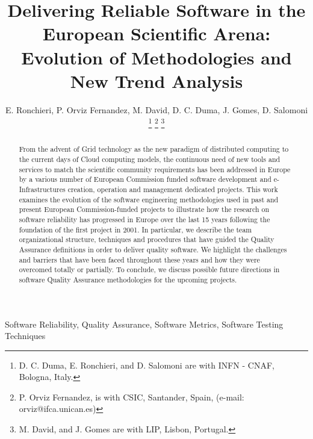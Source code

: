 \documentclass[journal]{IEEEtran}
\begin{document}
\title{Delivering Reliable Software in the European Scientific Arena: Evolution of Methodologies and New Trend Analysis}

\author{E. Ronchieri,
        P. Orviz Fernandez,
        M. David,
		D. C. Duma,
        J. Gomes,
        D. Salomoni
\thanks{D. C. Duma, E. Ronchieri, and D. Salomoni are with INFN - CNAF, Bologna, Italy.}
\thanks{P. Orviz Fernandez, is with CSIC, Santander, Spain, (e-mail: orviz@ifca.unican.es)}
\thanks{M. David, and J. Gomes are with LIP, Lisbon, Portugal.}%
}


\maketitle

\begin{abstract}
From the advent of Grid technology as the new paradigm of distributed
computing to the current days of Cloud computing models, the continuous need
of new tools and services to match the scientific community requirements has been
addressed in Europe by a various number of European Commission funded software development
and e-Infrastructures creation, operation and management dedicated projects.
This work examines the evolution of the software engineering methodologies used in past and present
European Commission-funded projects to illustrate how the research on software
reliability has progressed in Europe over the last 15 years following the
foundation of the first project in 2001. In particular, we describe the team
organizational structure, %
 techniques and procedures that have guided the Quality
Assurance definitions in order to deliver quality software. We highlight the challenges
and barriers that have been faced throughout these years and how they were overcomed totally or
partially. To conclude, we discuss possible future directions in software
Quality Assurance methodologies for the upcoming projects.
\end{abstract}

\begin{IEEEkeywords}
Software Reliability, Quality Assurance, Software Metrics, Software Testing
Techniques
\end{IEEEkeywords}
\end{document}
